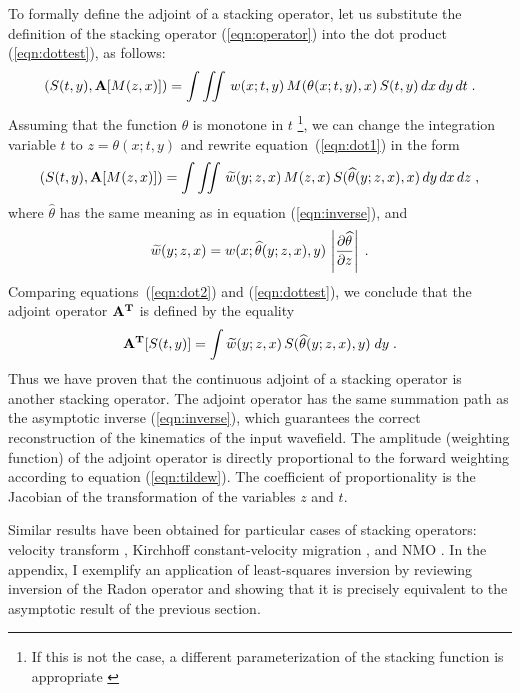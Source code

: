 \par
To formally define the adjoint of a stacking operator, 
let us substitute the definition of the stacking
operator (\ref{eqn:operator}) into the dot product
(\ref{eqn:dottest}), as follows:
\begin{equation}
\left(S(t,y),{\bf A}[M(z,x)]\right) =
\int\iint\,w(x;t,y)\,M(\theta(x;t,y),x)\,S(t,y)\,dx\,dy\,dt\;.
\label{eqn:dot1}
\end{equation}
Assuming that the function $\theta$ is monotone in $t$
\footnote{If this is not
  the case, a different parameterization of the stacking function is
  appropriate \cite[]{antial}}, we can change the integration variable $t$ to
$z=\theta(x;t,y)$ and rewrite equation~(\ref{eqn:dot1}) in the form
\begin{equation}
\left(S(t,y),{\bf A}[M(z,x)]\right) =
\int\iint\,\widetilde{w}(y;z,x)\,M(z,x)\,
S(\widehat{\theta}(y;z,x),x)\,dy\,dx\,dz\;,
\label{eqn:dot2}
\end{equation}
where $\widehat{\theta}$ has the same meaning as in equation
(\ref{eqn:inverse}), and
\begin{equation}
\widetilde{w}(y;z,x) = w(x;\widehat{\theta}(y;z,x),y)\,
\left|\partial \widehat{\theta} \over \partial z\right|\;.
\label{eqn:tildew}
\end{equation}
Comparing equations~(\ref{eqn:dot2}) and (\ref{eqn:dottest}), we conclude that the adjoint
operator ${\bf A^{T}}$ is defined by the equality
\begin{equation}
{\bf A^{T}}[S(t,y)]=
\int \widetilde{w}(y;z,x)\,S(\widehat{\theta}(y;z,x),y)\;dy\;.
\label{eqn:adjoint}
\end{equation}
Thus we have proven that the continuous adjoint of a
stacking operator is another stacking operator. The adjoint operator
has the same summation path as the asymptotic inverse (\ref{eqn:inverse}),
which guarantees the correct reconstruction of the kinematics of the
input wavefield. The amplitude (weighting function) of the adjoint
operator is directly proportional to the forward weighting according
to equation (\ref{eqn:tildew}). The coefficient of proportionality is the
Jacobian of the transformation of the variables $z$ and $t$.
\par
Similar results have been obtained for particular cases of stacking
operators: velocity transform
\cite[]{Thorson.sepphd.39,Jedlicka.sep.61.41}, Kirchhoff
constant-velocity migration \cite[]{Ji.sep.80.499}, and NMO \cite[]{sean}.
In the appendix, I exemplify an application of least-squares inversion
by reviewing inversion of the Radon operator and showing
that it is precisely equivalent to the asymptotic result of the
previous section.



